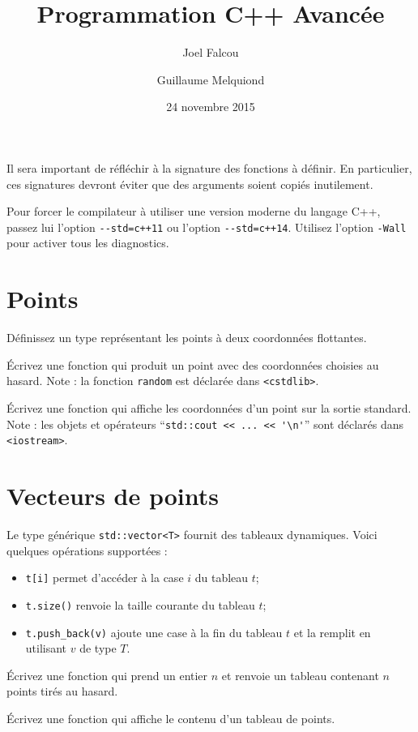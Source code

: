 \documentclass[a4paper]{article}
\title{\vspace{-2cm}Programmation C++ Avancée}
\author{Joel Falcou \and Guillaume Melquiond}
\date{24 novembre 2015}
\begin{document}
\maketitle

Il sera important de réfléchir à la signature des fonctions à définir. En
particulier, ces signatures devront éviter que des arguments soient
copiés inutilement.

Pour forcer le compilateur à utiliser une version moderne du langage C++,
passez lui l'option \lstinline|--std=c++11| ou l'option
\lstinline|--std=c++14|. Utilisez l'option \lstinline|-Wall| pour activer
tous les diagnostics.

\section{Points}

Définissez un type représentant les points à deux coordonnées flottantes.

Écrivez une fonction qui produit un point avec des coordonnées choisies
au hasard. Note : la fonction \lstinline|random| est déclarée dans
\lstinline|<cstdlib>|.

Écrivez une fonction qui affiche les coordonnées d'un point sur la sortie
standard. Note : les objets et opérateurs
``\lstinline|std::cout << ... << '\n'|'' sont déclarés dans
\lstinline|<iostream>|.

\section{Vecteurs de points}

Le type générique \lstinline|std::vector<T>| fournit des tableaux
dynamiques. Voici quelques opérations supportées :
\begin{itemize}
\item \lstinline|t[i]| permet d'accéder à la case $i$ du tableau $t$;
\item \lstinline|t.size()| renvoie la taille courante du tableau $t$;
\item \lstinline|t.push_back(v)| ajoute une case à la fin du tableau $t$
  et la remplit en utilisant $v$ de type $T$.
\end{itemize}

\smallskip

Écrivez une fonction qui prend un entier $n$ et renvoie un tableau
contenant $n$ points tirés au hasard.

Écrivez une fonction qui affiche le contenu d'un tableau de points.
\end{document}
